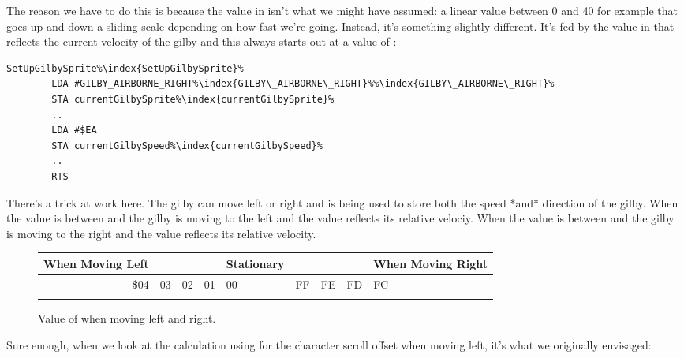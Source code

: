 The reason we have to do this is because the value in  isn't what we might have
assumed: a linear value between 0 and 40 for example that goes up and down a sliding scale depending on
how fast we're going. Instead, it's something slightly different. It's fed by the value in 
that reflects the current velocity of the gilby and this always starts out at a value of :

\begin{lstlisting}[escapechar=\%]
SetUpGilbySprite%\index{SetUpGilbySprite}%
        LDA #GILBY_AIRBORNE_RIGHT%\index{GILBY\_AIRBORNE\_RIGHT}%%\index{GILBY\_AIRBORNE\_RIGHT}%
        STA currentGilbySprite%\index{currentGilbySprite}%
        ..
        LDA #$EA
        STA currentGilbySpeed%\index{currentGilbySpeed}%
        ..
        RTS
\end{lstlisting}

There's a trick at work here. The gilby can move left or right and  is being used to
store both the speed *and* direction of the gilby. When the value is between  and  the gilby is moving
to the left and the value reflects its relative velociy. When the value is between  and  the gilby is
moving to the right and the value reflects its relative velocity.


\begin{figure}[H]
  {
    \setlength{\tabcolsep}{3.0pt}
    \setlength\cmidrulewidth{\heavyrulewidth} %
    \begin{adjustbox}{width=6cm,center}

      \begin{tabular}{rllllllll}
        \toprule
        When Moving Left &  & & & Stationary &  & & & When Moving Right    \\
        \midrule
        \$04 & 03 & 02 & 01 & 00 & FF & FE & FD & FC \\
        \addlinespace
        \bottomrule
      \end{tabular}
    \end{adjustbox}
  }\caption{Value of  when moving left and right.}
\end{figure}

Sure enough, when we look at the calculation using for the character scroll offset when moving left, it's what we
originally envisaged:

